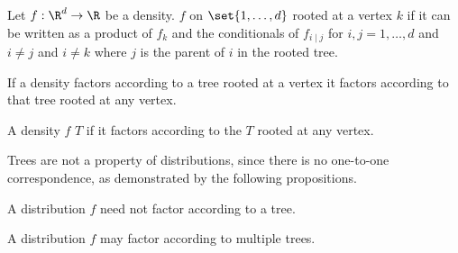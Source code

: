 
\sbasic







































\sstart
{}




Let $f: \R^d \to \R$ be a density.
$f$
on $\set{1, \dots, d}$ rooted
at a vertex $k$ if it can be
written as a product of $f_k$
and the conditionals of $f_{i \mid j}$
for $i,j = 1, \dots, d$ and $i \neq j$
and $i \neq k$ where $j$ is the parent
of $i$ in the rooted tree.


\begin{prop}
If a density factors according
to a tree rooted at a vertex it
factors according to that tree rooted
at any vertex.
\end{prop}


A density $f$
 $T$
if it factors according to the
$T$ rooted at any vertex.


Trees are not a property of distributions,
since there is no one-to-one correspondence,
as demonstrated by the following propositions.


A distribution $f$ need not factor according to a tree.

A distribution
$f$ may factor according to multiple trees.
\strats
